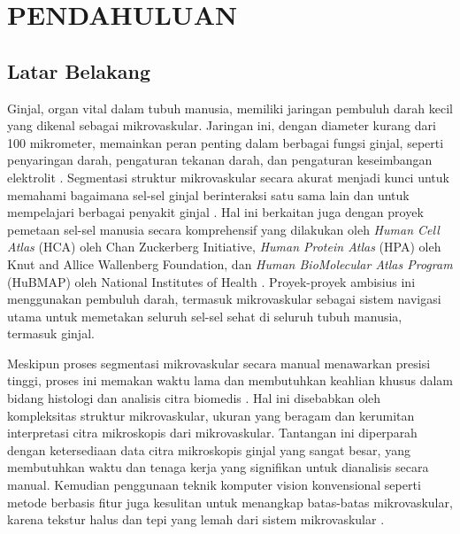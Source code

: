 \chapter{PENDAHULUAN}
\section{Latar Belakang}
\label{section:latarbelakang}
\noindent Ginjal, organ vital dalam tubuh manusia, memiliki jaringan pembuluh darah kecil yang dikenal sebagai mikrovaskular. Jaringan ini, dengan diameter kurang dari 100 mikrometer, memainkan peran penting dalam berbagai fungsi ginjal, seperti penyaringan darah, pengaturan tekanan darah, dan pengaturan keseimbangan elektrolit \cite{hu_multi-scale_2023}. Segmentasi struktur mikrovaskular secara akurat menjadi kunci untuk memahami bagaimana sel-sel ginjal berinteraksi satu sama lain dan untuk mempelajari berbagai penyakit ginjal \cite{zhang_attention-based_2023}. Hal ini berkaitan juga dengan proyek pemetaan sel-sel manusia secara komprehensif yang dilakukan oleh \textit{Human Cell Atlas} (HCA) oleh Chan Zuckerberg Initiative, \textit{Human Protein Atlas} (HPA) oleh Knut and Allice Wallenberg Foundation, dan \textit{Human BioMolecular Atlas Program} (HuBMAP) oleh National Institutes of Health \cite{weber_considerations_2020}. Proyek-proyek ambisius ini menggunakan pembuluh darah, termasuk mikrovaskular sebagai sistem navigasi utama untuk memetakan seluruh sel-sel sehat di seluruh tubuh manusia, termasuk ginjal. 

\noindent Meskipun proses segmentasi mikrovaskular secara manual menawarkan presisi tinggi, proses ini memakan waktu lama dan membutuhkan keahlian khusus dalam bidang histologi dan analisis citra biomedis \cite{hu_multi-scale_2023,weber_considerations_2020}. Hal ini disebabkan oleh kompleksitas struktur mikrovaskular, ukuran yang beragam dan kerumitan interpretasi citra mikroskopis dari mikrovaskular. Tantangan ini diperparah dengan ketersediaan data citra mikroskopis ginjal yang sangat besar, yang membutuhkan waktu dan tenaga kerja yang signifikan untuk dianalisis secara manual. Kemudian penggunaan teknik komputer vision konvensional seperti metode berbasis fitur juga kesulitan untuk menangkap batas-batas mikrovaskular, karena tekstur halus dan tepi yang lemah dari sistem mikrovaskular \cite{zhang_attention-based_2023}.



